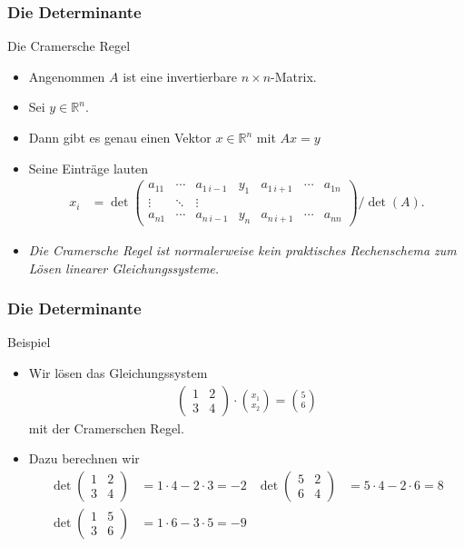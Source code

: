 \documentclass{beamer}
\renewcommand{\emph}[1]{{\textcolor{solarizedRed}{\itshape #1}}}
\newcommand\RR{\mathbb R}
\renewcommand{\ae}{\"a}
\renewcommand{\oe}{\"o}
\newcommand{\mytitle}{Die Determinante}
\begin{document}
\begin{frame}\frametitle{\mytitle}
	\begin{block}{Die Cramersche Regel}
		\begin{itemize}
			\item Angenommen $A$ ist eine invertierbare $n\times n$-Matrix.
			\item Sei $y\in\RR^n$.
			\item Dann gibt es genau einen Vektor $x\in\RR^n$ mit $Ax=y$
			\item Seine Eintr\ae ge lauten
				\begin{align*}
					x_i&=\det\begin{pmatrix}
						a_{11}&\cdots&a_{1\,i-1}&y_1&a_{1\,i+1}&\cdots&a_{1n}\\
						\vdots&\ddots&\vdots\\
						a_{n1}&\cdots&a_{n\,i-1}&y_n&a_{n\,i+1}&\cdots&a_{nn}
					\end{pmatrix}/\det(A).
				\end{align*}
			\item \emph{Die Cramersche Regel ist normalerweise kein praktisches Rechenschema zum L\oe sen linearer Gleichungssysteme.}
		\end{itemize}
	\end{block}
\end{frame}

\begin{frame}\frametitle{\mytitle}
	\begin{block}{Beispiel}
		\begin{itemize}
			\item Wir l\oe sen das Gleichungssystem
				\begin{align*}
				\begin{pmatrix} 1&2\\3&4 \end{pmatrix}\cdot\binom{x_1}{x_2}=\binom56
				\end{align*}
				mit der Cramerschen Regel.
			\item Dazu berechnen wir
				\begin{align*}
					\det\begin{pmatrix} 1&2\\3&4 \end{pmatrix}&=1\cdot4-2\cdot 3=-2&
					\det\begin{pmatrix} 5&2\\6&4 \end{pmatrix}&=5\cdot4-2\cdot 6=8\\
					\det\begin{pmatrix} 1&5\\3&6 \end{pmatrix}&=1\cdot 6-3\cdot 5=-9
				\end{align*}
		\end{itemize}
	\end{block}
\end{frame}
\end{document}
